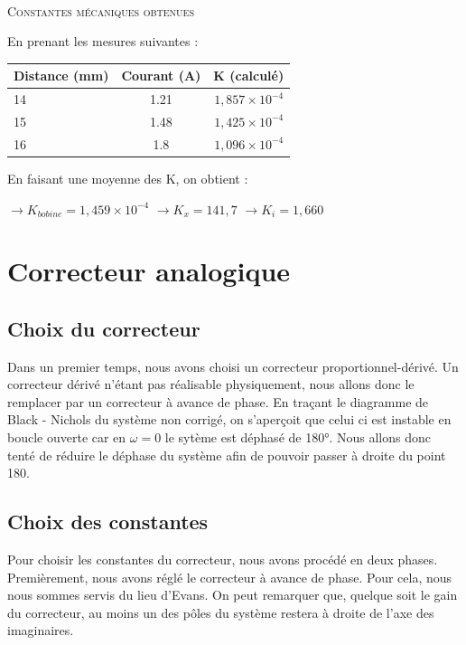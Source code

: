 \documentclass[11pt, french]{article} %
\begin{document}
\paragraph{}
\textsc{Constantes mécaniques obtenues }

En prenant les mesures suivantes :

\medskip
\begin{tabular} {|l|c|r|}
	 \hline
	\textbf{Distance (mm)} & \textbf{Courant (A)} & \textbf{K (calculé)} \\ \hline
	14 & 1.21 & $ 1,857 \times 10^{-4} $ \\ \hline
	15 & 1.48 & $ 1,425  \times 10^{-4} $ \\ \hline
	16 & 1.8 & $ 1,096  \times 10^{-4} $ \\ \hline
\end{tabular}

\medskip
\noindent
En faisant une moyenne des K, on obtient :

\medskip
$ \rightarrow K_{bobine} = 1,459 \times 10^{-4} $
$ \rightarrow K_x = 141,7 $
$ \rightarrow K_i = 1,660 $

\section{Correcteur analogique}
\subsection{Choix du correcteur}
Dans un premier temps, nous avons choisi un correcteur proportionnel-dérivé. Un correcteur dérivé n'étant pas réalisable physiquement, nous allons donc le remplacer par un correcteur à avance de phase.
\medskip
En traçant le diagramme de Black - Nichols du système non corrigé, on s'aperçoit que celui ci est instable en boucle ouverte car en $\omega = 0$ le sytème est déphasé de 180°. Nous allons donc tenté de réduire le déphase du système afin de pouvoir passer à droite du point 180.

\medskip


\subsection{Choix des constantes}

Pour choisir les constantes du correcteur, nous avons procédé en deux phases. Premièrement, nous avons réglé le correcteur à avance de phase. Pour cela, nous nous sommes servis du lieu d'Evans. On peut remarquer que, quelque soit le gain du correcteur, au moins un des pôles du système restera à droite de l'axe des imaginaires.
\end{document}
